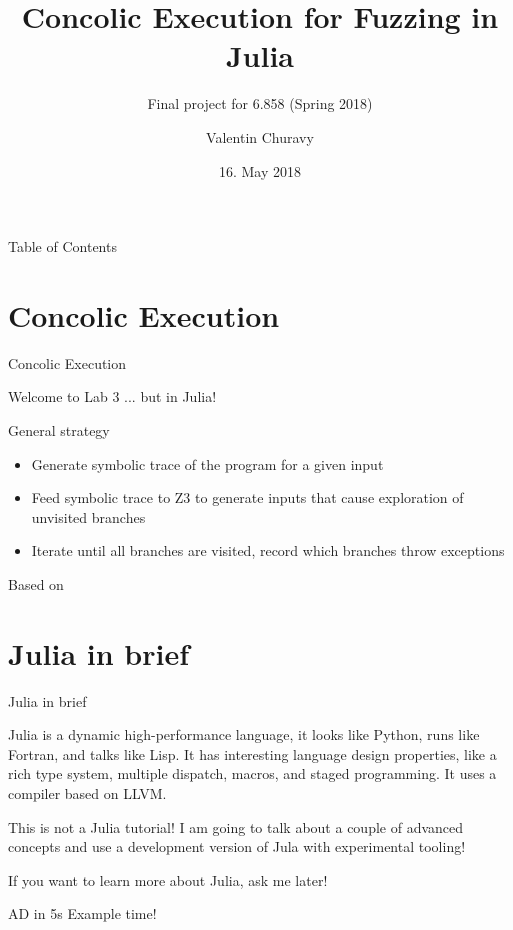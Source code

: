 \documentclass{beamer}
\title{Concolic Execution for Fuzzing in Julia}
\subtitle{Final project for 6.858 (Spring 2018)}
\author{Valentin Churavy}
\institute[CSAIL]{JuliaLab@CSAIL}
\date{16. May 2018}
\begin{document}
  \begin{frame}[plain]
    \titlepage
  \end{frame}
  \begin{frame}{Table of Contents}
    \tableofcontents[hideallsubsections]
  \end{frame}
  \section{Concolic Execution}
  \begin{frame}{Concolic Execution}
      \begin{block}{Welcome to Lab 3}
          \pause
          ... but in Julia!
      \end{block}
\pause
      \begin{block}{General strategy}
          \begin{itemize}[<+->]
          \item Generate symbolic trace of the program for a given input
          \item Feed symbolic trace to Z3 to generate inputs that cause exploration of unvisited branches
          \item Iterate until all branches are visited, record which branches throw exceptions
      \end{itemize}
          Based on \cite{Godefroid2005-ld, Cadar2006-hs}
      \end{block}
  \end{frame}
  \section{Julia in brief}
  \begin{frame}{Julia in brief}
      \begin{block}{}
          Julia \cite{Bezanson2012-iw} is a dynamic high-performance language, it looks like Python, runs like Fortran,
      and talks like Lisp. It has interesting language design properties, like a rich type
          system, multiple dispatch, macros, and staged programming. It uses a compiler based on LLVM\cite{Lattner2004-dv}.
      \end{block}

      \pause
      \begin{exampleblock}{This is not a Julia tutorial!}
          I am going to talk about a couple of advanced concepts and use a
          development version of Jula with experimental tooling!

          If you want to learn more about Julia, ask me later!
      \end{exampleblock}

      \pause
      \begin{block}{AD in 5s}
          Example time!
      \end{block}
  \end{frame}
\end{document}
